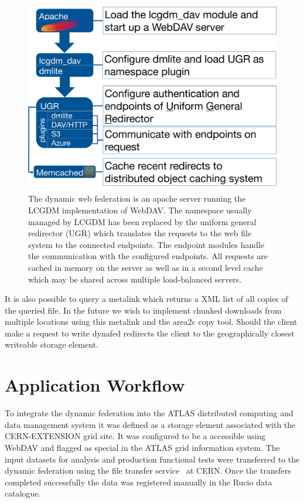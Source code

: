 \documentclass[a4paper]{jpconf}
\begin{document}
\begin{figure}
  \centering
  \includegraphics[width=\textwidth]{dynafed-arch.png}
  \caption{The dynamic web federation is an apache server running the LCGDM implementation of WebDAV. The namespace usually managed by LCGDM has been replaced by the uniform general redirector (UGR) which translates the requests to the web file system to the connected endpoints. The endpoint modules handle the communication with the configured endpoints. All requests are cached in memory on the server as well as in a second level cache which may be shared across multiple load-balanced servers.}
  \label{fig:dynafed-arch}
\end{figure}

 It is also possible to query a metalink which returns a XML list of all copies of the queried file. In the future we wish to implement chunked downloads from multiple locations using this metalink and the area2c copy tool. Should the client make a request to write dynafed redirects the client to the geographically closest writeable storage element.


\section{Application Workflow}
To integrate the dynamic federation into the ATLAS distributed computing and data management system it was defined as a storage element associated with the \textrm{CERN-EXTENSION} grid site. It was configured to be a accessible using WebDAV and flagged as special in the ATLAS grid information system. The input datasets for analysis and production functional tests were transferred to the dynamic federation using the file transfer service~\cite{fts3} at CERN. Once the transfers completed successfully the data was registered manually in the Rucio data catalogue.
\end{document}
